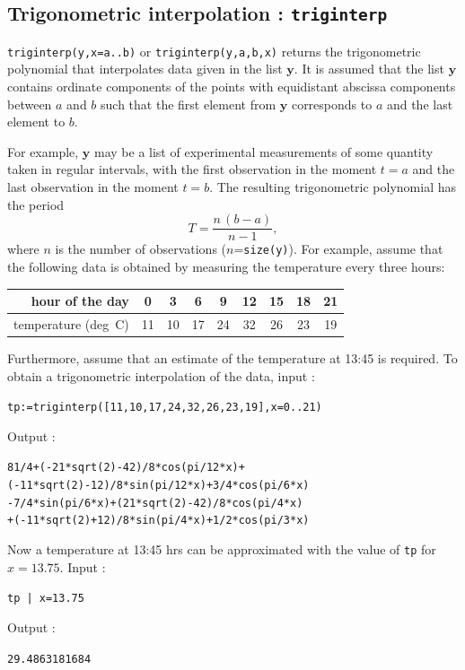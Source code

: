 \documentclass[a4paper,11pt]{book}
\begin{document}
\subsection{Trigonometric interpolation : {\tt triginterp}}
{\tt triginterp(y,x=a..b)} or {\tt triginterp(y,a,b,x)} returns the trigonometric polynomial that interpolates data given in the list $ \textbf{y} $. It is assumed that the list $ \textbf{y} $ contains ordinate components of the points with equidistant abscissa components between $ a $ and $ b $ such that the first element from $ \textbf{y} $ corresponds to $ a $ and the last element to $ b $.

For example, $ \textbf{y} $ may be a list of experimental measurements of some quantity taken in regular intervals, with the first observation in the moment $ t=a $ and the last observation in the moment $ t=b $. The resulting trigonometric polynomial has the period
\[ T=\frac{n\,(b-a)}{n-1}, \]
where $ n $ is the number of observations ($ n $={\tt size(y)}). For example, assume that the following data is obtained by measuring the temperature every three hours:
\begin{center}
	\begin{tabular}{|r|c|c|c|c|c|c|c|c|}
		\hline hour of the day&0&3&6&9&12&15&18&21\\
		\hline temperature (deg~C)&11&10&17&24&32&26&23&19\\\hline
	\end{tabular}
\end{center}
Furthermore, assume that an estimate of the temperature at 13:45 is required. To obtain a trigonometric interpolation of the data, input :
\begin{center}
	{\tt tp:=triginterp([11,10,17,24,32,26,23,19],x=0..21)}
\end{center}
Output :
\begin{center}
	{\tt 81/4+(-21*sqrt(2)-42)/8*cos(pi/12*x)+\\
		(-11*sqrt(2)-12)/8*sin(pi/12*x)+3/4*cos(pi/6*x)\\
		-7/4*sin(pi/6*x)+(21*sqrt(2)-42)/8*cos(pi/4*x)\\
		+(-11*sqrt(2)+12)/8*sin(pi/4*x)+1/2*cos(pi/3*x)}
\end{center}
Now a temperature at 13:45 hrs can be approximated with the value of {\tt tp} for $ x=13.75 $. Input :
\begin{center}
	{\tt tp | x=13.75}
\end{center}
Output :
\begin{center}
	{\tt 29.4863181684}
\end{center}
\end{document}
